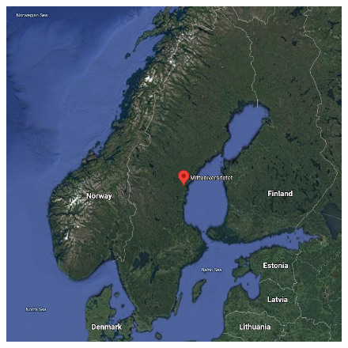 \begin{frame}
\begin{figure}
{    \includegraphics[height=0.35\textheight]{fig/miun-map.png}}
  \end{figure}
\end{frame}

